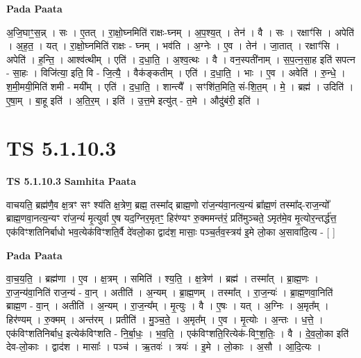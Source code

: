 \documentclass[17pt]{extarticle}
\begin{document}
\textbf{Pada Paata} \newline

अ॒जि॒घाꣳ॒॒स॒न्न् । सः । ए॒तत् । रा॒क्षो॒घ्नमिति॑ राक्षः-घ्नम् । अ॒प॒श्य॒त् । तेन॑ । वै । सः । रक्षाꣳ॑सि । अपेति॑ । अ॒ह॒त॒ । यत् । रा॒क्षो॒घ्नमिति॑ राक्षः - घ्नम् । भव॑ति । अ॒ग्नेः । ए॒व । तेन॑ । जा॒तात् । रक्षाꣳ॑सि । अपेति॑ । ह॒न्ति॒ । आश्व॑त्थीम् । एति॑ । द॒धा॒ति॒ । अ॒श्व॒त्थः । वै । वन॒स्पती॑नाम् । स॒प॒त्न॒सा॒ह इति॑ सपत्न - सा॒हः । विजि॑त्या॒ इति॒ वि - जि॒त्यै॒ । वैक॑ङ्कतीम् । एति॑ । द॒धा॒ति॒ । भाः । ए॒व । अवेति॑ । रु॒न्धे॒ । श॒मी॒मयी॒मिति॑ शमी - मयी᳚म् । एति॑ । द॒धा॒ति॒ । शान्त्यै᳚ । सꣳशि॑त॒मिति॒ सं-शि॒त॒म् । मे॒ । ब्रह्म॑ । उदिति॑ । ए॒षा॒म् । बा॒हू इति॑ । अ॒ति॒र॒म् । इति॑ । उ॒त्त॒मे इत्यु॑त् - त॒मे । औदु॑बंरी॒ इति॑ ।  \newline




\section*{ TS 5.1.10.3 }

\textbf{TS 5.1.10.3 } \newline
\textbf{Samhita Paata} \newline

वाचयति॒ ब्रह्म॑णै॒व क्ष॒त्रꣳ सꣳ श्य॑ति क्ष॒त्रेण॒ ब्रह्म॒ तस्मा᳚द् ब्राह्म॒णो रा॑ज॒न्य॑वा॒नत्य॒न्यं ब्रा᳚ह्म॒णं तस्मा᳚द्-राज॒न्यो᳚ ब्राह्म॒णवा॒नत्य॒न्यꣳ रा॑ज॒न्यं॑ मृ॒त्युर्वा ए॒ष यद॒ग्निर॒मृतꣳ॒॒ हिर॑ण्यꣳ रु॒क्ममन्त॑रं॒ प्रति॑मुञ्चते॒ ऽमृत॑मे॒व मृ॒त्योर॒न्तर्द्ध॑त्त॒ एक॑विꣳशतिनिर्बाधो भव॒त्येक॑विꣳशति॒र्वै दे॑वलो॒का द्वाद॑श॒ मासाः॒ पञ्च॒र्तव॒स्त्रय॑ इ॒मे लो॒का अ॒सावा॑दि॒त्य - [  ] \newline

\textbf{Pada Paata} \newline

वा॒च॒य॒ति॒ । ब्रह्म॑णा । ए॒व । क्ष॒त्रम् । समिति॑ । श्य॒ति॒ । क्ष॒त्रेण॑ । ब्रह्म॑ । तस्मा᳚त् । ब्रा॒ह्म॒णः । रा॒ज॒न्य॑वा॒निति॑ राज॒न्य॑ - वा॒न् । अतीति॑ । अ॒न्यम् । ब्रा॒ह्म॒णम् । तस्मा᳚त् । रा॒ज॒न्यः॑ । ब्रा॒ह्म॒णवा॒निति॑ ब्राह्म॒ण - वा॒न् । अतीति॑ । अ॒न्यम् । रा॒ज॒न्य᳚म् । मृ॒त्युः । वै । ए॒षः । यत् । अ॒ग्निः । अ॒मृत᳚म् । हिर॑ण्यम् । रु॒क्मम् । अन्त॑रम् । प्रतीति॑ । मु॒ञ्च॒ते॒ । अ॒मृत᳚म् । ए॒व । मृ॒त्योः । अ॒न्तः । ध॒त्ते॒ । एक॑विꣳशतिनिर्बाध॒ इत्येक॑विꣳशति - नि॒र्बा॒धः॒ । भ॒व॒ति॒ । एक॑विꣳशति॒रित्येक॑-विꣳ॒॒श॒तिः॒ । वै । दे॒व॒लो॒का इति॑ देव-लो॒काः । द्वाद॑श । मासाः᳚ । पञ्च॑ । ऋ॒तवः॑ । त्रयः॑ । इ॒मे । लो॒काः । अ॒सौ । आ॒दि॒त्यः ।  \newline
\end{document}

